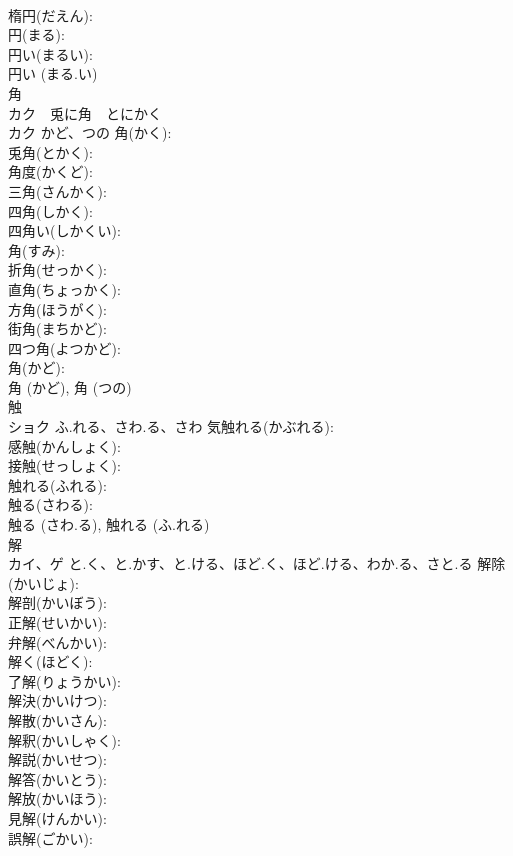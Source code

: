 \documentclass[8pt]{extreport}
\begin{document}
\begin{CJK}{UTF8}{min}
\\	楕円(だえん): 
\\	円(まる): 
\\	円い(まるい): 
\\	円い (まる.い)
\\	角			
\\	カク　兎に角　とにかく
\\	カク	かど、つの	角(かく): 
\\	兎角(とかく): 
\\	角度(かくど): 
\\	三角(さんかく): 
\\	四角(しかく): 
\\	四角い(しかくい): 
\\	角(すみ): 
\\	折角(せっかく): 
\\	直角(ちょっかく): 
\\	方角(ほうがく): 
\\	街角(まちかど): 
\\	四つ角(よつかど): 
\\	角(かど): 
\\	角 (かど), 角 (つの)
\\	触			
\\	ショク	ふ.れる、さわ.る、さわ	気触れる(かぶれる): 
\\	感触(かんしょく): 
\\	接触(せっしょく): 
\\	触れる(ふれる): 
\\	触る(さわる): 
\\	触る (さわ.る), 触れる (ふ.れる)
\\	解			
\\	カイ、ゲ	と.く、と.かす、と.ける、ほど.く、ほど.ける、わか.る、さと.る	解除(かいじょ): 
\\	解剖(かいぼう): 
\\	正解(せいかい): 
\\	弁解(べんかい): 
\\	解く(ほどく): 
\\	了解(りょうかい): 
\\	解決(かいけつ): 
\\	解散(かいさん): 
\\	解釈(かいしゃく): 
\\	解説(かいせつ): 
\\	解答(かいとう): 
\\	解放(かいほう): 
\\	見解(けんかい): 
\\	誤解(ごかい): 

\end{CJK}
\end{document}
